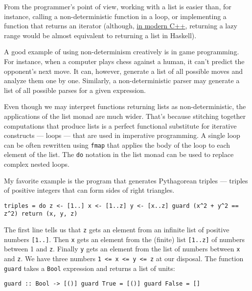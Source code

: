 From the programmer's point of view, working with a list is easier than,
for instance, calling a non-deterministic function in a loop, or
implementing a function that returns an iterator (although,
\href{http://ericniebler.com/2014/04/27/range-comprehensions/}{in modern
C++}, returning a lazy range would be almost equivalent to returning a
list in Haskell).

A good example of using non-determinism creatively is in game
programming. For instance, when a computer plays chess against a human,
it can't predict the opponent's next move. It can, however, generate a
list of all possible moves and analyze them one by one. Similarly, a
non-deterministic parser may generate a list of all possible parses for
a given expression.

Even though we may interpret functions returning lists as
non-deterministic, the applications of the list monad are much wider.
That's because stitching together computations that produce lists is a
perfect functional substitute for iterative constructs --- loops ---
that are used in imperative programming. A single loop can be often
rewritten using \texttt{fmap} that applies the body of the loop to each
element of the list. The \texttt{do} notation in the list monad can be
used to replace complex nested loops.

My favorite example is the program that generates Pythagorean triples
--- triples of positive integers that can form sides of right triangles.

\begin{verbatim}
triples = do z <- [1..] x <- [1..z] y <- [x..z] guard (x^2 + y^2 == z^2) return (x, y, z)
\end{verbatim}

The first line tells us that \texttt{z} gets an element from an infinite
list of positive numbers \texttt{{[}1..{]}}. Then \texttt{x} gets an
element from the (finite) list \texttt{{[}1..z{]}} of numbers between 1
and \texttt{z}. Finally \texttt{y} gets an element from the list of
numbers between \texttt{x} and \texttt{z}. We have three numbers
\texttt{1\ \textless{}=\ x\ \textless{}=\ y\ \textless{}=\ z} at our
disposal. The function \texttt{guard} takes a \texttt{Bool} expression
and returns a list of units:

\begin{verbatim}
guard :: Bool -> [()] guard True = [()] guard False = []
\end{verbatim}


